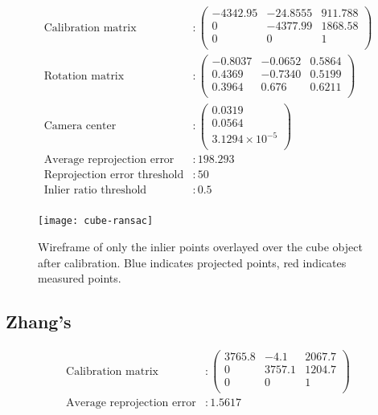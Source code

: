 \documentclass[a4paper,11pt]{article}
\begin{document}
     \begin{align*}
     \text{Calibration matrix}
     &: 
     \begin{pmatrix}
       -4342.95 & -24.8555 & 911.788\\
       0 & -4377.99 & 1868.58\\
       0 & 0 & 1\\
     \end{pmatrix}\\
     \text{Rotation matrix}
     &:
     \begin{pmatrix}
      -0.8037 & -0.0652 & 0.5864 \\
      0.4369 & -0.7340 & 0.5199 \\
      0.3964 & 0.676 & 0.6211 \\
     \end{pmatrix}\\
      \text{Camera center}
      &:
      \begin{pmatrix}
      0.0319\\
      0.0564\\
      3.1294\times10^{-5}\\
      \end{pmatrix}\\
     \text{Average reprojection error}
     &: 198.293\\
     \text{Reprojection error threshold}&: 50\\
     \text{Inlier ratio threshold}&: 0.5\\
    \end{align*}
    
     \begin{figure}[H]
      \centering
      \texttt{[image: cube-ransac]}
      \caption{Wireframe of only the inlier points overlayed over the cube object after calibration. Blue indicates projected points, red indicates measured points.}
     \end{figure}

    \subsection*{Zhang's}
    \begin{align*}
     \text{Calibration matrix}&: 
     \begin{pmatrix}
       3765.8 & -4.1 & 2067.7 \\
       0 & 3757.1 & 1204.7 \\
       0 & 0 & 1\\
     \end{pmatrix}\\
     \text{Average reprojection error}
     &: 1.5617\\
     \end{align*}
     
\end{document}
